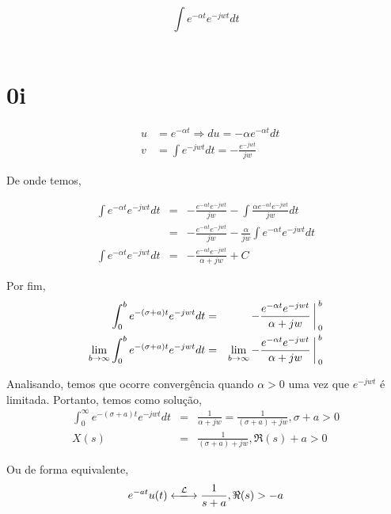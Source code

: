 \documentclass[9pt]{beamer}
\begin{document}
\begin{frame}
  \justifying
  $$ \int e^{-\alpha t} e^{-jwt} dt $$
  \  \section{0i}
\begin{eqnarray}
    & u  & =  e^{-\alpha t} \Rightarrow  du  =   -\alpha e^{-\alpha t} dt \nonumber  \\
    & v & =  \int e^{-jwt} dt =  -\frac {e^{-jwt}} {jw} \nonumber   
  \end{eqnarray}
  \par
  De onde temos,
  \par
  \begin{eqnarray}
    \int e^{-\alpha t} e^{-jwt} dt & = & -\frac {e^{-\alpha t} e^{-jwt}} {jw} - \int \frac {\alpha e^{-\alpha t} e^{ -jwt}} {jw} dt \nonumber \\
    &  = &  -\frac {e^{-\alpha t} e^{-jwt}} {jw} - \frac {\alpha} {jw} \int e^{-\alpha t} e^{-jwt} dt \nonumber \\
    \int e^{-\alpha t} e^{-jwt} dt & = & -\frac{e^{-\alpha t} e^{-jwt}} {\alpha + jw}  + C \nonumber
  \end{eqnarray}
\end{frame}
\begin{frame}
  \justifying
  Por fim,
  \begin{eqnarray}
    \int_{0}^{b} e^{-(\sigma + a)t} e^{-jwt} dt & = &  -\frac { e^{-\alpha t} e^{-jwt}} {\alpha + jw} \bigg \arrowvert_{0}^{b} \nonumber \\
    \lim_{b\rightarrow\infty} {\int_{0}^{b} e^{-(\sigma + a)t} e^{-jwt}} dt & = & \lim_{b\rightarrow\infty} {-\frac {e^{- \alpha t } e^{-jwt}} {\alpha + jw} \bigg \arrowvert_{0}^{b}} \nonumber
  \end{eqnarray}
  \par
  Analisando, temos que ocorre   converg\^{e}ncia quando  $ \alpha > 0 $ uma vez que $ e^{-jwt}$ \'{e} limitada. Portanto, temos como solu\c{c}\~{a}o,
  \begin{eqnarray}
    \int_{0}^{\infty} e^{-(\sigma + a)t} e^{-jwt} dt & = & \frac {1} {\alpha + jw} = \frac {1} {(\sigma + a) +  jw}, \sigma + a > 0 \nonumber \\
    X(s) & = & \frac {1} {(\sigma + a) + jw}, \Re(s) + a > 0 \nonumber
  \end{eqnarray}
  \par
  Ou de forma equivalente,
  \begin{eqnarray}
    e^{-at} u(t) \xlongleftrightarrow{\mathcal{L}} \frac {1} {s + a }, \Re (s)> -a \nonumber
  \end{eqnarray}
\end{frame}
\end{document}
